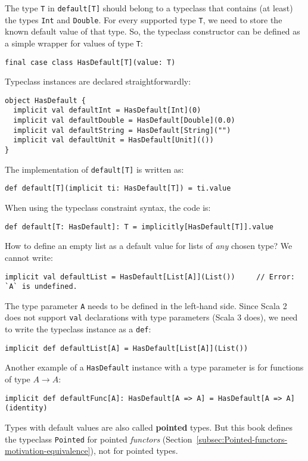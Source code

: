 The type \lstinline!T! in \lstinline!default[T]! should belong to
a typeclass that contains (at least) the types \lstinline!Int! and
\lstinline!Double!. For every supported type \lstinline!T!, we need
to store the known default value of that type. So, the typeclass constructor
can be defined as a simple wrapper for values of type \lstinline!T!:
\begin{lstlisting}
final case class HasDefault[T](value: T)
\end{lstlisting}
Typeclass instances are declared straightforwardly:
\begin{lstlisting}
object HasDefault {
  implicit val defaultInt = HasDefault[Int](0)
  implicit val defaultDouble = HasDefault[Double](0.0)
  implicit val defaultString = HasDefault[String]("")
  implicit val defaultUnit = HasDefault[Unit](())
}
\end{lstlisting}
The implementation of \lstinline!default[T]! is written as:
\begin{lstlisting}
def default[T](implicit ti: HasDefault[T]) = ti.value
\end{lstlisting}
When using the typeclass constraint syntax, the code is:
\begin{lstlisting}
def default[T: HasDefault]: T = implicitly[HasDefault[T]].value
\end{lstlisting}

How to define an empty list as a default value for lists of \emph{any}
chosen type? We cannot write:
\begin{lstlisting}
implicit val defaultList = HasDefault[List[A]](List())     // Error: `A` is undefined.
\end{lstlisting}
The type parameter \lstinline!A! needs to be defined in the left-hand
side. Since Scala 2 does not support \lstinline!val! declarations
with type parameters (Scala 3 does), we need to write the typeclass
instance as a \lstinline!def!:
\begin{lstlisting}
implicit def defaultList[A] = HasDefault[List[A]](List())
\end{lstlisting}

Another example of a \lstinline!HasDefault! instance with a type
parameter is for functions of type $A\rightarrow A$:
\begin{lstlisting}
implicit def defaultFunc[A]: HasDefault[A => A] = HasDefault[A => A](identity)
\end{lstlisting}

Types with default values are also called \textbf{pointed}
types. But this book defines the typeclass \lstinline!Pointed! for
pointed \emph{functors} (Section~\ref{subsec:Pointed-functors-motivation-equivalence}),
not for pointed types.

